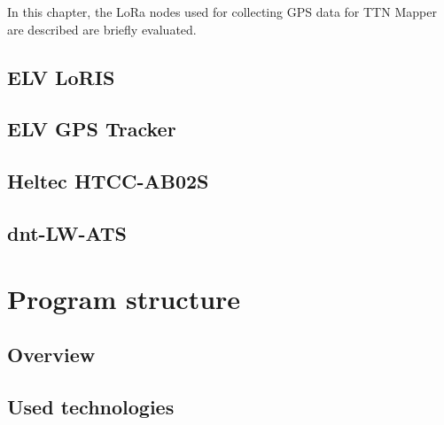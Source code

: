 In this chapter, the \ac{LoRa} nodes used for collecting GPS data for TTN Mapper are described are briefly evaluated.

\subsection{ELV LoRIS}


\subsection{ELV GPS Tracker}


\subsection{Heltec HTCC-AB02S}


\subsection{dnt-LW-ATS}


\section{Program structure}

\subsection{Overview}

\subsection{Used technologies}

